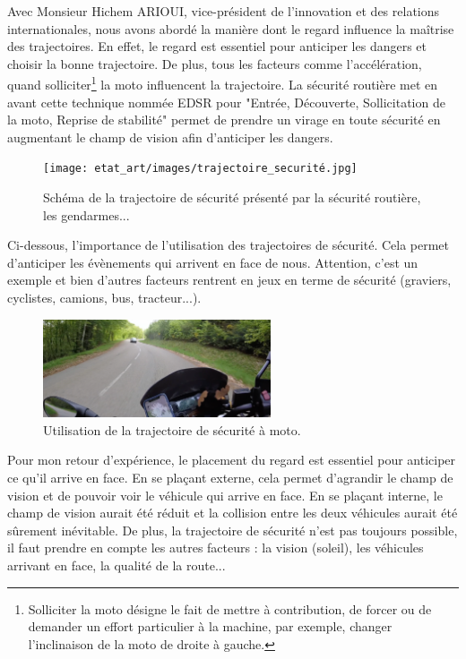 Avec Monsieur Hichem ARIOUI, vice-président de l’innovation et des relations internationales, nous avons abordé la manière dont le regard influence la maîtrise des trajectoires. En effet, le regard est essentiel pour anticiper les dangers et choisir la bonne trajectoire. De plus, tous les facteurs comme l'accélération, quand solliciter\footnote{Solliciter la moto désigne le fait de mettre à contribution, de forcer ou de demander un effort particulier à la machine, par exemple, changer l'inclinaison de la moto de droite à gauche.} la moto influencent la trajectoire. 
La sécurité routière\cite{trajectoire_securite} met en avant cette technique nommée EDSR pour "Entrée, Découverte, Sollicitation de la moto, Reprise de stabilité" permet de prendre un virage en toute sécurité en augmentant le champ de vision afin d'anticiper les dangers. 
\begin{figure}[H]
    \centering
    \texttt{[image: etat\_art/images/trajectoire\_securité.jpg]} 
    \caption{Schéma de la trajectoire de sécurité présenté par la sécurité routière, les gendarmes...}
    \label{fig:trajectoire_securite}
\end{figure}
Ci-dessous, l'importance de l'utilisation des trajectoires de sécurité. Cela permet d'anticiper les évènements qui arrivent en face de nous. Attention, c’est un exemple et bien d’autres facteurs rentrent en jeux en terme de sécurité  (graviers, cyclistes, camions, bus, tracteur...).
\begin{figure}[H]
    \centering
    \includegraphics[width=0.6\textwidth]{etat_art/images/morvan.png} 
    \caption{Utilisation de la trajectoire de sécurité à moto.}
\end{figure}
Pour mon retour d'expérience, le placement du regard est essentiel pour anticiper ce qu'il arrive en face. En se plaçant externe, cela permet d'agrandir le champ de vision et de pouvoir voir le véhicule qui arrive en face. En se plaçant interne, le champ de vision aurait été réduit et la collision entre les deux véhicules aurait été sûrement inévitable. De plus, la trajectoire de sécurité n'est pas toujours possible, il faut prendre en compte les autres facteurs : la vision (soleil), les véhicules arrivant en face, la qualité de la route...
